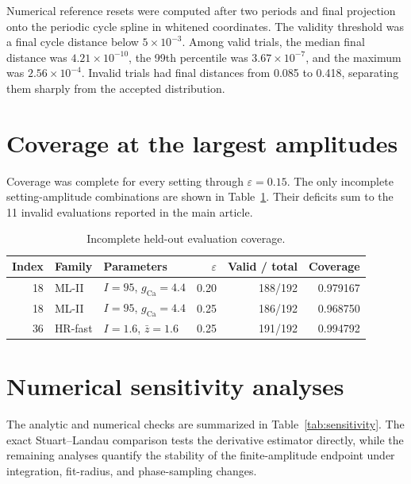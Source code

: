 \documentclass[11pt]{article}
\newcommand{\eps}{\varepsilon}
\begin{document}
Numerical reference resets were computed after two periods and final projection onto the periodic cycle spline in whitened coordinates. The validity threshold was a final cycle distance below $5\times10^{-3}$. Among valid trials, the median final distance was $4.21\times10^{-10}$, the 99th percentile was $3.67\times10^{-7}$, and the maximum was $2.56\times10^{-4}$. Invalid trials had final distances from 0.085 to 0.418, separating them sharply from the accepted distribution.

\section{Coverage at the largest amplitudes}
Coverage was complete for every setting through $\eps=0.15$. The only incomplete setting-amplitude combinations are shown in Table~\ref{tab:coverage}. Their deficits sum to the 11 invalid evaluations reported in the main article.

\begin{table}[ht]
\centering
\caption{Incomplete held-out evaluation coverage.}
\label{tab:coverage}
\begin{tabular}{rllrrr}
\toprule
Index & Family & Parameters & $\eps$ & Valid / total & Coverage\\
\midrule
18 & ML-II & $I=95$, $g_{\mathrm{Ca}}=4.4$ & 0.20 & 188/192 & 0.979167\\
18 & ML-II & $I=95$, $g_{\mathrm{Ca}}=4.4$ & 0.25 & 186/192 & 0.968750\\
36 & HR-fast & $I=1.6$, $\bar z=1.6$ & 0.25 & 191/192 & 0.994792\\
\bottomrule
\end{tabular}
\end{table}

\section{Numerical sensitivity analyses}
The analytic and numerical checks are summarized in Table~\ref{tab:sensitivity}. The exact Stuart--Landau comparison tests the derivative estimator directly, while the remaining analyses quantify the stability of the finite-amplitude endpoint under integration, fit-radius, and phase-sampling changes.
\end{document}
